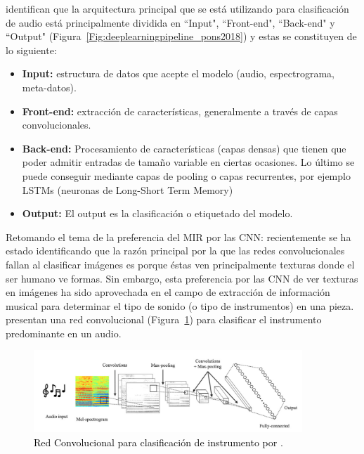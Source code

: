 \cite{pons:end2end:2018} identifican que la arquitectura principal que se está utilizando para clasificación de audio está principalmente dividida en ``Input", ``Front-end", ``Back-end"{ } y ``Output" (Figura~\ref{Fig:deeplearningpipeline_pons2018}) y estas se constituyen de lo siguiente:
\begin{itemize}
\item \textbf{Input:} estructura de datos que acepte el modelo (audio, espectrograma, meta-datos).
\item \textbf{Front-end:} extracción de características, generalmente a través de capas convolucionales.
\item \textbf{Back-end:} Procesamiento de características (capas densas) que tienen que poder admitir entradas de tamaño variable en ciertas ocasiones. Lo último se puede conseguir mediante capas de pooling o capas recurrentes, por ejemplo LSTMs (neuronas de Long-Short Term Memory)
\item \textbf{Output:} El output es la clasificación o etiquetado del modelo.
\end{itemize}

Retomando el tema de la preferencia del MIR por las CNN: recientemente se ha estado identificando que la razón principal por la que las redes convolucionales fallan al clasificar imágenes es porque éstas ven principalmente texturas donde el ser humano ve formas. Sin embargo, esta preferencia por las CNN de ver texturas en imágenes ha sido aprovechada en el campo de extracción de información musical para determinar el tipo de sonido (o tipo de instrumentos) en una pieza. \cite{Han:instrumentRecognition:2017} presentan una red convolucional (Figura~\ref{Fig:CNN_instrument2017}) para clasificar el instrumento predominante en un audio. 

\begin{figure}[htb]
  \centering
  \includegraphics[width=0.9\textwidth]{Figures/CNN_instrument2017.png}
  \caption{\textcolor{black}{Red Convolucional para clasificación de instrumento por \cite{Han:instrumentRecognition:2017}}.}
  \label{Fig:CNN_instrument2017}
\end{figure}

